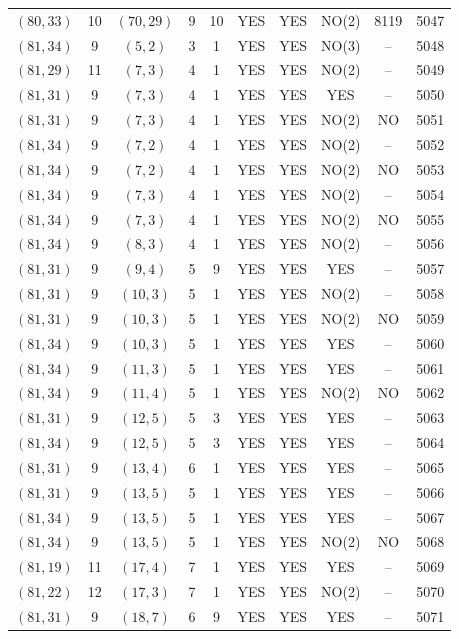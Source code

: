 \begin{longtable}{|c|c|c|c|c|c|c|c|c|c|}
$(80, 33)$ & 10 & $(70, 29)$ & 9 & 10 & YES & YES & NO(2) & 8119 & 5047\\
$(81, 34)$ & 9 & $(5, 2)$ & 3 & 1 & YES & YES & NO(3) & -- & 5048\\
$(81, 29)$ & 11 & $(7, 3)$ & 4 & 1 & YES & YES & NO(2) & -- & 5049\\
$(81, 31)$ & 9 & $(7, 3)$ & 4 & 1 & YES & YES & YES & -- & 5050\\
$(81, 31)$ & 9 & $(7, 3)$ & 4 & 1 & YES & YES & NO(2) & NO & 5051\\
$(81, 34)$ & 9 & $(7, 2)$ & 4 & 1 & YES & YES & NO(2) & -- & 5052\\
$(81, 34)$ & 9 & $(7, 2)$ & 4 & 1 & YES & YES & NO(2) & NO & 5053\\
$(81, 34)$ & 9 & $(7, 3)$ & 4 & 1 & YES & YES & NO(2) & -- & 5054\\
$(81, 34)$ & 9 & $(7, 3)$ & 4 & 1 & YES & YES & NO(2) & NO & 5055\\
$(81, 34)$ & 9 & $(8, 3)$ & 4 & 1 & YES & YES & NO(2) & -- & 5056\\
$(81, 31)$ & 9 & $(9, 4)$ & 5 & 9 & YES & YES & YES & -- & 5057\\
$(81, 31)$ & 9 & $(10, 3)$ & 5 & 1 & YES & YES & NO(2) & -- & 5058\\
$(81, 31)$ & 9 & $(10, 3)$ & 5 & 1 & YES & YES & NO(2) & NO & 5059\\
$(81, 34)$ & 9 & $(10, 3)$ & 5 & 1 & YES & YES & YES & -- & 5060\\
$(81, 34)$ & 9 & $(11, 3)$ & 5 & 1 & YES & YES & YES & -- & 5061\\
$(81, 34)$ & 9 & $(11, 4)$ & 5 & 1 & YES & YES & NO(2) & NO & 5062\\
$(81, 31)$ & 9 & $(12, 5)$ & 5 & 3 & YES & YES & YES & -- & 5063\\
$(81, 34)$ & 9 & $(12, 5)$ & 5 & 3 & YES & YES & YES & -- & 5064\\
$(81, 31)$ & 9 & $(13, 4)$ & 6 & 1 & YES & YES & YES & -- & 5065\\
$(81, 31)$ & 9 & $(13, 5)$ & 5 & 1 & YES & YES & YES & -- & 5066\\
$(81, 34)$ & 9 & $(13, 5)$ & 5 & 1 & YES & YES & YES & -- & 5067\\
$(81, 34)$ & 9 & $(13, 5)$ & 5 & 1 & YES & YES & NO(2) & NO & 5068\\
$(81, 19)$ & 11 & $(17, 4)$ & 7 & 1 & YES & YES & YES & -- & 5069\\
$(81, 22)$ & 12 & $(17, 3)$ & 7 & 1 & YES & YES & NO(2) & -- & 5070\\
$(81, 31)$ & 9 & $(18, 7)$ & 6 & 9 & YES & YES & YES & -- & 5071\\

\end{longtable}
